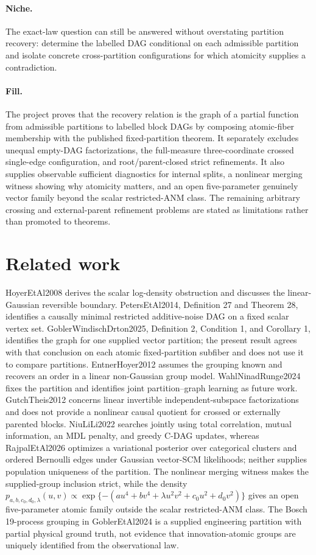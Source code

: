 \documentclass{article}
\begin{document}
\paragraph{Niche.} The exact-law question can still be answered without overstating partition recovery: determine the labelled DAG conditional on each admissible partition and isolate concrete cross-partition configurations for which atomicity supplies a contradiction.

\paragraph{Fill.} The project proves that the recovery relation is the graph of a partial function from admissible partitions to labelled block DAGs by composing atomic-fiber membership with the published fixed-partition theorem. It separately excludes unequal empty-DAG factorizations, the full-measure three-coordinate crossed single-edge configuration, and root/parent-closed strict refinements. It also supplies observable sufficient diagnostics for internal splits, a nonlinear merging witness showing why atomicity matters, and an open five-parameter genuinely vector family beyond the scalar restricted-ANM class. The remaining arbitrary crossing and external-parent refinement problems are stated as limitations rather than promoted to theorems.

\section{Related work}

HoyerEtAl2008 derives the scalar log-density obstruction and discusses the linear-Gaussian reversible boundary. PetersEtAl2014, Definition 27 and Theorem 28, identifies a causally minimal restricted additive-noise DAG on a fixed scalar vertex set. GoblerWindischDrton2025, Definition 2, Condition 1, and Corollary 1, identifies the graph for one supplied vector partition; the present result agrees with that conclusion on each atomic fixed-partition subfiber and does not use it to compare partitions. EntnerHoyer2012 assumes the grouping known and recovers an order in a linear non-Gaussian group model. WahlNinadRunge2024 fixes the partition and identifies joint partition--graph learning as future work. GutchTheis2012 concerns linear invertible independent-subspace factorizations and does not provide a nonlinear causal quotient for crossed or externally parented blocks. NiuLiLi2022 searches jointly using total correlation, mutual information, an MDL penalty, and greedy C-DAG updates, whereas RajpalEtAl2026 optimizes a variational posterior over categorical clusters and ordered Bernoulli edges under Gaussian vector-SCM likelihoods; neither supplies population uniqueness of the partition. The nonlinear merging witness makes the supplied-group inclusion strict, while the density \(p_{a,b,c_0,d_0,\lambda}(u,v)\propto\exp\{-(a u^4+b v^4+\lambda u^2v^2+c_0u^2+d_0v^2)\}\) gives an open five-parameter atomic family outside the scalar restricted-ANM class. The Bosch 19-process grouping in GoblerEtAl2024 is a supplied engineering partition with partial physical ground truth, not evidence that innovation-atomic groups are uniquely identified from the observational law.
\end{document}
